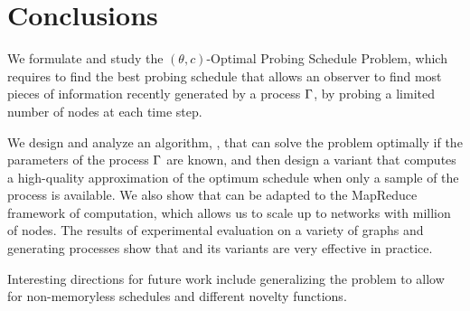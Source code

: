 \section{Conclusions}\label{sec:concl}
We formulate and study the $(\theta,c)$-Optimal Probing Schedule Problem,
which requires to find the best probing schedule that allows an observer to find
most pieces of information recently generated by a process $\Gamma$, by probing a
limited number of nodes at each time step.

We design and analyze an algorithm, \algoname, that can solve the problem
optimally if the parameters of the process $\Gamma$ are known, and then design a
variant that computes a high-quality approximation of the optimum schedule when
only a sample of the process is available. We also show that \algoname can be
adapted to the MapReduce framework of computation, which allows us to scale up
to networks with million of nodes. The results of experimental evaluation on a
variety of graphs and generating processes show that \algoname and its variants
are very effective in practice.

Interesting directions for future work include generalizing the problem to allow
for non-memoryless schedules and different novelty functions.
